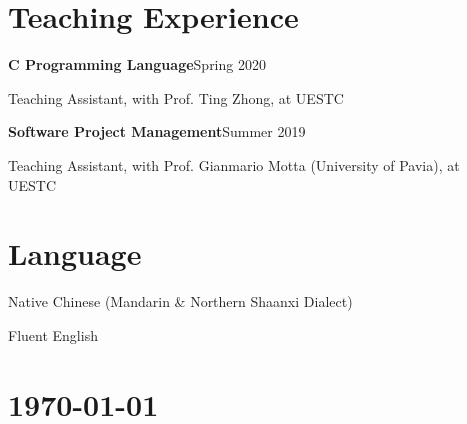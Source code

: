 \documentclass{article}
\begin{document}






\section*{Teaching Experience}
\indent


\textbf{C Programming Language}\hfill Spring 2020

\hspace{2em}Teaching Assistant, with Prof. Ting Zhong, at UESTC

\textbf{Software Project Management}\hfill Summer 2019

\hspace{2em}Teaching Assistant, with Prof. Gianmario Motta (University of Pavia), at UESTC







\section*{Language}
\indent

Native Chinese (Mandarin \& Northern Shaanxi Dialect)

Fluent English





\vfill

\section*{\hfill\color{OliveGreen}\today}
\end{document}
